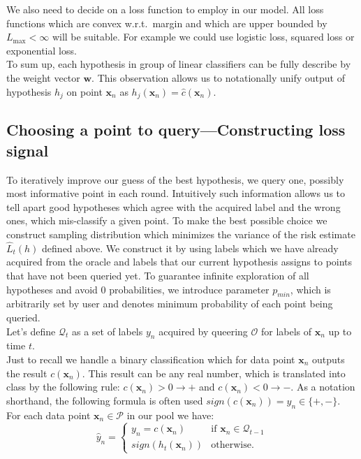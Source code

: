 \documentclass[12pt, a4paper, pdflatex, leqno, twoside]{report}
\begin{document}
We also need to decide on a loss function to employ in our model. All loss 
functions which are convex w.r.t.\ margin and which are upper bounded by 
$L_{\text{max}} < \infty$ will be suitable. For example we could use logistic 
loss, squared loss or exponential loss.\\

To sum up, each hypothesis in group of linear classifiers can be fully describe 
by the weight vector $\mathbf{w}$. This observation allows us to notationally unify 
output of hypothesis $h_j$ on point $\mathbf{x}_n$ as $h_j(\mathbf{x}_n) = 
\hat{c}(\mathbf{x}_n)$.\\


\subsection{Choosing a point to query---Constructing loss 
signal\label{sec:pointtoquery}}
To iteratively improve our guess of the best hypothesis, we query one, possibly most 
informative point in each round. Intuitively such information allows us to tell 
apart good hypotheses which agree with the acquired label and the wrong ones, which mis-classify a given point. To make the best possible choice we construct sampling 
distribution which minimizes the variance of the risk estimate $\hat{L}_t(h)$ 
defined above. We construct it by using labels which we have already acquired from the oracle and labels that our current hypothesis assigns to points 
that have not been queried yet. To guarantee infinite exploration of all 
hypotheses and avoid $0$ probabilities, we introduce parameter $p_{min}$, which 
is arbitrarily set by user and denotes minimum probability of each point being 
queried.\\

Let's define $\mathscr{Q}_t$ as a set of labels $y_n$ acquired by queering $\mathscr{O}$ for labels of $\mathbf{x}_n$ up to time $t$.\\
Just to recall we handle a binary classification which for data point 
$\mathbf{x}_n$ outputs the result $c(\mathbf{x}_n)$. This result can be any real 
number, which is translated into class by the following rule: $c(\mathbf{x}_n) > 
0 \rightarrow +$ and $c(\mathbf{x}_n) < 0 \rightarrow -$. As a notation 
shorthand, the following formula is often used $\textit{sign}(c(\mathbf{x}_n)) = y_n \in \{+, -\}$.\\

For each data point $\mathbf{x}_n \in \mathscr{P}$ in our pool we have:
$$
\hat{y}_n = \begin{cases}
                                    y_n = c(\mathbf{x}_n)  & \text{if } 
\mathbf{x}_n \in \mathscr{Q}_{t-1} \\
                                    \textit{sign}(h_t(\mathbf{x}_n)) & 
\text{otherwise.}
                                  \end{cases} 
$$
\end{document}

